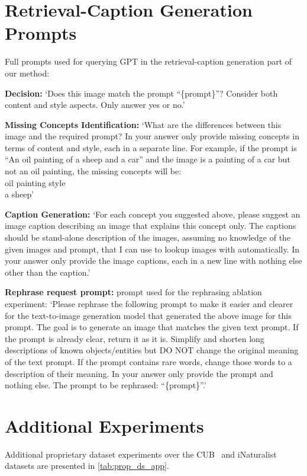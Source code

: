 \clearpage
\appendix

\section{Retrieval-Caption Generation Prompts}
\label{app:prompts}

Full prompts used for querying GPT in the retrieval-caption generation part of our method:

\textbf{Decision:} 
`Does this image match the prompt ``\{prompt\}''? Consider both content and style aspects. Only answer yes or no.'

\textbf{Missing Concepts Identification:}
`What are the differences between this image and the required prompt? In your answer only provide missing concepts in terms of content and style, each in a separate line. For example, if the prompt is ``An oil painting of a sheep and a car'' and the image is a painting of a car but not an oil painting, the missing concepts will be: \\
oil painting style \\
a sheep'

\textbf{Caption Generation:}
`For each concept you suggested above, please suggest an image caption describing an image that explains this concept only. The captions should be stand-alone description of the images, assuming no knowledge of the given images and prompt, that I can use to lookup images with automatically. In your answer only provide the image captions, each in a new line with nothing else other than the caption.'

\textbf{Rephrase request prompt:}
prompt used for the rephrasing ablation experiment:
`Please rephrase the following prompt to make it easier and clearer for the text-to-image generation model that generated the above image for this prompt. The goal is to generate an image that matches the given text prompt. If the prompt is already clear, return it as it is. Simplify and shorten long descriptions of known objects/entities but DO NOT change the original meaning of the text prompt. If the prompt contains rare words, change those words to a description of their meaning. In your answer only provide the prompt and nothing else. The prompt to be rephrased: ``\{prompt\}''.'

\section{Additional Experiments}

Additional proprietary dataset experiments over the CUB~\cite{wah2011caltech} and iNaturalist~\cite{van2018inaturalist} datasets are presented in \cref{tab:prop_ds_app}.

